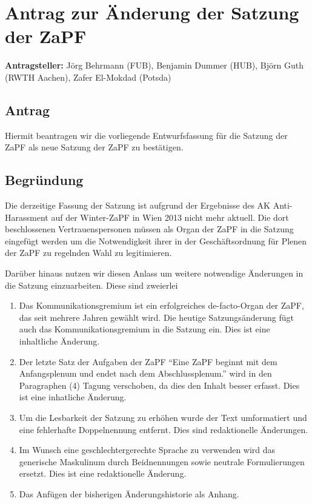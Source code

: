 \documentclass[draft,12pt,oneside]{scrartcl}
\begin{document}
\section*{Antrag zur Änderung der Satzung der ZaPF}

\textbf{Antragsteller:} Jörg Behrmann (FUB), Benjamin Dummer (HUB), Björn Guth (RWTH Aachen), Zafer El-Mokdad (Potsda)

\subsection*{Antrag}

Hiermit beantragen wir die vorliegende Entwurfsfassung für die Satzung der ZaPF als neue Satzung der ZaPF zu bestätigen.

\subsection*{Begründung}

Die derzeitige Fassung der Satzung ist aufgrund der Ergebnisse des AK Anti-Harassment auf der Winter-ZaPF in Wien
2013 nicht mehr aktuell. Die dort beschlossenen Vertrauenspersonen müssen als Organ der ZaPF in die Satzung eingefügt
werden um die Notwendigkeit ihrer in der Geschäftsordnung für Plenen der ZaPF zu regelnden Wahl zu legitimieren.

Darüber hinaus nutzen wir diesen Anlass um weitere notwendige Änderungen in die Satzung einzuarbeiten. Diese sind
zweierlei
\begin{enumerate}
\item Das Kommunikationsgremium ist ein erfolgreiches de-facto-Organ der ZaPF, das seit mehrere Jahren gewählt wird.
      Die heutige Satzungsänderung fügt auch das Kommunikationsgremium in die Satzung ein. Dies ist eine inhaltliche
      Änderung.
\item Der letzte Satz der Aufgaben der ZaPF ``Eine ZaPF beginnt mit dem Anfangsplenum und endet nach dem Abschlussplenum.''
      wird in den Paragraphen (4) Tagung verschoben, da dies den Inhalt besser erfasst. Dies ist eine inhatliche Änderung.
\item Um die Lesbarkeit der Satzung zu erhöhen wurde der Text umformatiert und eine fehlerhafte Doppelnennung entfernt.
      Dies sind redaktionelle Änderungen.
\item Im Wunsch eine geschlechtergerechte Sprache zu verwenden wird das generische Maskulinum durch Beidnennungen
      sowie neutrale Formulierungen ersetzt. Dies ist eine redaktionelle Änderung.
\item Das Anfügen der bisherigen Änderungshistorie als Anhang.
\end{enumerate}
\end{document}
